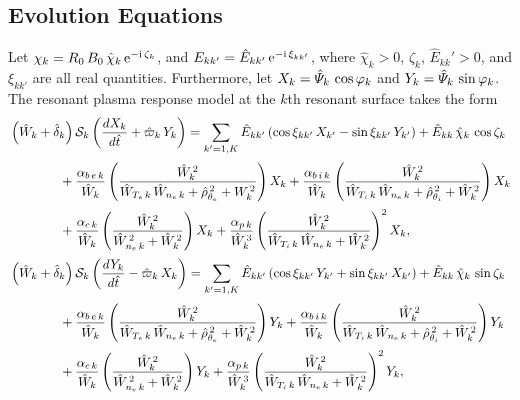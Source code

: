 \documentclass[notitlepage,12pt]{article}
\begin{document}
\subsection{Evolution Equations}
Let ${\mit\chi}_k= R_0\,B_0\,\hat{\chi}_k\,{\rm e}^{-{\rm i}\,\zeta_k}$, and $E_{kk'}=\hat{E}_{kk'}\,{\rm e}^{-{\rm i}\,\xi_{kk'}}$,
where  $\hat{\chi}_k>0$, $\zeta_k$, $\hat{E}_{kk}'>0$, and $\xi_{kk'}$ are all real quantities. Furthermore,
let $X_k= \hat{\mit\Psi}_k\,\cos\varphi_k$ and $Y_k= \hat{\mit\Psi}_k\,\sin\varphi_k$. The resonant plasma response model at the 
$k$th resonant surface takes the form
\begin{align}\label{e21}
&\left(\hat{W}_k +\hat{\delta}_k\right){\cal S}_k\left(\frac{dX_k}{d\hat{t}} 
+\hat{\varpi}_k\,Y_k\right)= \sum_{k'=1,K}\hat{E}_{kk'}\,(\cos\xi_{kk'}\,X_{k'}  -\sin\xi_{kk'}\,Y_{k'}) + \hat{E}_{kk}\,\hat{\chi}_k\,\cos\zeta_k\nonumber\\[0.5ex]&\phantom{=====} +\frac{\alpha_{b\,e\,k}}{\hat{W}_k}\left(\frac{\hat{W}_k^{\,2}}{\hat{W}_{T_{e}\,k}\,\hat{W}_{n_e\,k}+\hat{\rho}_{\theta_e}^{\,2}+W_k^{\,2}}\right)X_k+\frac{\alpha_{b\,i\,k}}{\hat{W}_k}\left(\frac{\hat{W}_k^{\,2}}{\hat{W}_{T_{i}\,k}\,\hat{W}_{n_e\,k}+\hat{\rho}_{\theta_i}^{\,2}+\hat{W}_k^{\,2}}\right)X_k\nonumber\\[0.5ex]
&\phantom{=====}+\frac{\alpha_{c\,k}}{\hat{W}_k}\left(\frac{\hat{W}_k^{\,2}}{\hat{W}_{n_e\,k}^{\,2}+\hat{W}_k^{\,2}}\right)X_k+\frac{\alpha_{p\,k}}{\hat{W}_k^{\,3}}\left(\frac{\hat{W}_k^{\,2}}{\hat{W}_{T_{i}\,k}\,\hat{W}_{n_e\,k}+\hat{W}_k^{\,2}}\right)^2 X_k,\\[0.5ex]
&\left(\hat{W}_k +\hat{\delta}_k\right){\cal S}_k\left(\frac{dY_k}{d\hat{t}} -\hat{\varpi}_k\,X_k\right)
= \sum_{k'=1,K}\hat{E}_{kk'}\,(\cos\xi_{kk'}\,Y_{k'}
+\sin\xi_{kk'}\,X_{k'}) + \hat{E}_{kk}\,\hat{\chi}_k\,\sin\zeta_k\nonumber\\[0.5ex]&\phantom{=====} +\frac{\alpha_{b\,e\,k}}{\hat{W}_k}\left(\frac{\hat{W}_k^{\,2}}{\hat{W}_{T_{e}\,k}\,\hat{W}_{n_e\,k}+\hat{\rho}_{\theta_e}^{\,2}+\hat{W}_k^{\,2}}\right)Y_k+\frac{\alpha_{b\,i\,k}}{\hat{W}_k}\left(\frac{\hat{W}_k^{\,2}}{\hat{W}_{T_{i}\,k}\,\hat{W}_{n_e\,k}+\hat{\rho}_{\theta_i}^{\,2}+\hat{W}_k^{\,2}}\right)Y_k\nonumber\\[0.5ex]
&\phantom{=====}+\frac{\alpha_{c\,k}}{\hat{W}_k}\left(\frac{\hat{W}_k^{\,2}}{\hat{W}_{n_e\,k}^{\,2}+\hat{W}_k^{\,2}}\right)Y_k+\frac{\alpha_{p\,k}}{\hat{W}_k^{\,3}}\left(\frac{\hat{W}_k^{\,2}}{\hat{W}_{T_{i}\,k}\,\hat{W}_{n_e\,k}+\hat{W}_k^{\,2}}\right)^2 Y_k,\label{e22}
\end{align}
\end{document}
